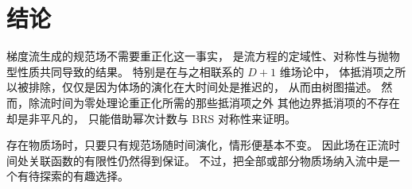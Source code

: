 \section{结论}\label{sec:conclusions}

梯度流生成的规范场不需要重正化这一事实，
是流方程的定域性、对称性与抛物型性质共同导致的结果。
特别是在与之相联系的 $D+1$ 维场论中，
体抵消项之所以被排除，仅仅是因为体场的演化在大时间处是推迟的，
从而由树图描述。
然而，除流时间为零处理论重正化所需的那些抵消项之外
其他边界抵消项的不存在却是非平凡的，
只能借助幂次计数与 BRS 对称性来证明。

存在物质场时，只要只有规范场随时间演化，情形便基本不变。
因此场在正流时间处关联函数的有限性仍然得到保证。
不过，把全部或部分物质场纳入流中是一个有待探索的有趣选择。
